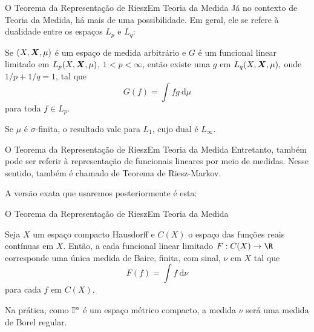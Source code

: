 \documentclass[13pt]{beamer}
\begin{document}
\begin{frame}{O Teorema da Representação de Riesz}{Em Teoria da Medida}
    Já no contexto de Teoria da Medida, há mais de uma possibilidade.
    Em geral, ele se refere à dualidade entre os espaços \( L_{ p } \) e \( L_{ q } \):
    \begin{teo*}
        Se \( ( X, \bm{X}, \mu ) \) é um espaço de medida arbitrário e \( G \) é um funcional linear limitado em \( L_{ p } ( X, \bm{X}, \mu ) \), \( 1 < p < \infty \), então existe uma \( g \) em \( L_{ q } ( X, \bm{X}, \mu ), \) onde \( 1/p + 1/q = 1 \), tal que
        \begin{equation*}
            G ( f ) = \int f g \ \mathrm{d} \mu
        \end{equation*}
        para toda \( f \in L_{ p } \).
    \end{teo*}
    Se \( \mu \) é \( \sigma \)-finita, o resultado vale para \( L_{ 1 } \), cujo dual é \( L_{ \infty } \).
\end{frame}

\begin{frame}{O Teorema da Representação de Riesz}{Em Teoria da Medida}
    Entretanto, também pode ser referir à representação de funcionais lineares por meio de medidas.
    Nesse sentido, também é chamado de Teorema de Riesz-Markov.

    A versão exata que usaremos posteriormente é esta:
\end{frame}

\begin{frame}{O Teorema da Representação de Riesz}{Em Teoria da Medida}
    \begin{teo*}
        Seja \( X \) um espaço compacto Hausdorff e \( C ( X ) \) o espaço das funções reais contínuas em \( X \).
        Então, a cada funcional linear limitado \( F : C ( X ) \to \R \) corresponde uma única medida de Baire, finita, com sinal, \( \nu \) em \( X \) tal que
        \begin{equation*}
            F ( f ) = \int f \ \mathrm{d} \nu
        \end{equation*}
        para cada \( f \) em \( C ( X ) \).
    \end{teo*}
    Na prática, como \( \mathbb{I}^{ n } \) é um espaço métrico compacto, a medida \( \nu \) será uma medida de Borel regular.
\end{frame}
\end{document}
